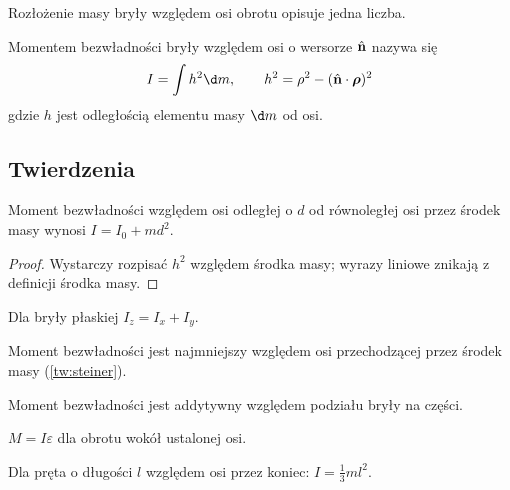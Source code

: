 \documentclass[a4paper, polish, 11pt]{scrartcl}
\begin{document}
Rozłożenie masy bryły względem osi obrotu opisuje jedna liczba.

\begin{definition}\label{def:I}
Momentem bezwładności bryły względem osi o wersorze $\vu{n}$ nazywa się
\begin{equation}
	I = \int h^2 \d m, \qquad h^2 = \rho^2 - (\vu{n} \vdot \vb{\rho})^2
	\label{eq:I}
\end{equation}
gdzie $h$ jest odległością elementu masy $\d m$ od osi.
\end{definition}

\subsection{Twierdzenia}\label{sec:twierdzenia}

\begin{theorem}\label{tw:steiner}
Moment bezwładności względem osi odległej o $d$ od równoległej osi przez środek masy wynosi $I = I_0 + md^2$.
\end{theorem}

\begin{proof}
Wystarczy rozpisać $h^2$ względem środka masy; wyrazy liniowe znikają z definicji środka masy.
\end{proof}

\begin{lemma}
Dla bryły płaskiej $I_z = I_x + I_y$.
\end{lemma}

\begin{corollary}
Moment bezwładności jest najmniejszy względem osi przechodzącej przez środek masy (\cref{tw:steiner}).
\end{corollary}

\begin{fact}
Moment bezwładności jest addytywny względem podziału bryły na części.
\end{fact}

\begin{law}
$M = I\varepsilon$ dla obrotu wokół ustalonej osi.
\end{law}

\begin{example}
Dla pręta o długości $l$ względem osi przez koniec: $I = \frac{1}{3}ml^2$.
\end{example}
\end{document}
